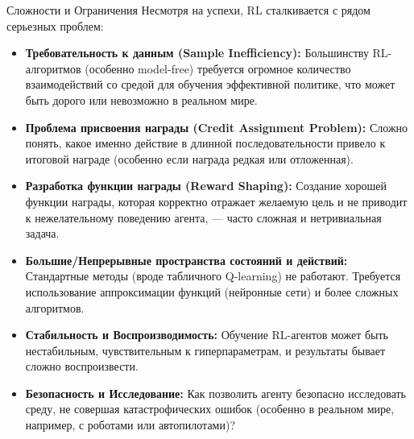 \begin{alerttextbox}{Сложности и Ограничения}
    Несмотря на успехи, RL сталкивается с рядом серьезных проблем:
    \begin{itemize}
        \item \textbf{Требовательность к данным (Sample Inefficiency):} Большинству RL-алгоритмов (особенно model-free) требуется огромное количество взаимодействий со средой для обучения эффективной политике, что может быть дорого или невозможно в реальном мире.
        \item \textbf{Проблема присвоения награды (Credit Assignment Problem):} Сложно понять, какое именно действие в длинной последовательности привело к итоговой награде (особенно если награда редкая или отложенная).
        \item \textbf{Разработка функции награды (Reward Shaping):} Создание хорошей функции награды, которая корректно отражает желаемую цель и не приводит к нежелательному поведению агента, — часто сложная и нетривиальная задача.
        \item \textbf{Большие/Непрерывные пространства состояний и действий:} Стандартные методы (вроде табличного Q-learning) не работают. Требуется использование аппроксимации функций (нейронные сети) и более сложных алгоритмов.
        \item \textbf{Стабильность и Воспроизводимость:} Обучение RL-агентов может быть нестабильным, чувствительным к гиперпараметрам, и результаты бывает сложно воспроизвести.
        \item \textbf{Безопасность и Исследование:} Как позволить агенту безопасно исследовать среду, не совершая катастрофических ошибок (особенно в реальном мире, например, с роботами или автопилотами)?
    \end{itemize}
\end{alerttextbox}

